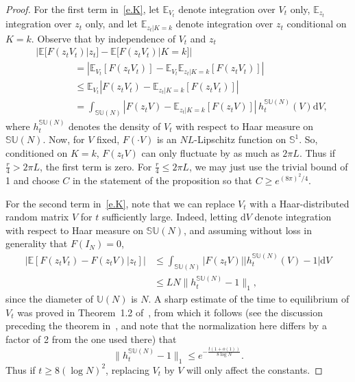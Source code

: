 \documentclass[11pt]{article}
\theoremstyle{definition}
\numberwithin{equation}{section}
\numberwithin{figure}{section}
\numberwithin{table}{section}
\newcommand{\Unitary}[1]{\mathbb{U}\left(#1\right)}
\newcommand{\SUnitary}[1]{\mathbb{SU}\left(#1\right)}
\newcommand{\Circle}{\mathbb{S}^1}
\newcommand{\E}{\mathbb{E}}
\newcommand*{\dd}{\mathrm{d}}
\newcommand*{\dV}{\dd V}
\begin{document}
\begin{proof}
For the first term in~\eqref{e.K}, let $\E_{V_t}$ denote integration over $V_t$ only, $\E_{z_t}$ integration over $z_t$ only, and let $\E_{z_t|K=k}$ denote integration over $z_t$ conditional on $K=k$. Observe that by independence of $V_t$ and $z_t$
\begin{align*}
&\left|\E\big[F(z_tV_t)\big|z_t\big] -\E \big[F(z_tV_t)\big|K=k\big]\right|\\&\qquad\qquad=\left|\E_{V_t}\left[F(z_tV_t)\right]-\E_{V_t}\E_{z_t|K=k}\left[F(z_tV_t)\right]\right|\\&\qquad\qquad\le\E_{V_t}\left|F(z_tV_t)-\E_{z_t|K=k}\left[F(z_tV_t)\right]\right| \\
&\qquad\qquad= \int_{\SUnitary{N}} |F(z_tV) - \mathbb{E}_{z_t|K=k}[F(z_t V)]| \,h^{\SUnitary{N}}_t(V)\dV,
\end{align*}
where $h^{\SUnitary{N}}_t$ denotes the density of $V_t$ with respect to Haar measure on $\SUnitary{N}$. Now, for $V$ fixed, $F(\cdot V)$ is an $NL$-Lipschitz function on $\Circle$. So, conditioned on $K=k$, $F(z_tV)$ can only fluctuate by as much as $2\pi L$. Thus if $\frac{r}{4}>2\pi L$, the first term is zero. For $\frac{r}{4}\le2\pi L$, we may just use the trivial bound of 1 and choose $C$ in the statement of the proposition so that $C\ge e^{(8\pi)^2/4}$.

For the second term in~\eqref{e.K}, note that we can replace $V_t$ with a Haar-distributed random matrix $V$ for $t$ sufficiently large. Indeed, letting $\dV$ denote integration with respect to Haar measure on $\SUnitary{N}$, and assuming without loss in generality that $F(I_N)=0$,
\begin{equation}\label{eC}
\begin{split}
\left|\E\left[F(z_tV_t)-F(z_tV)\big|z_t\right]\right|&\le\int_{\SUnitary{N}}\big|F(z_tV)\big|\big|h^{\SUnitary{N}}_t(V)-1\big|\dV\\&\le LN\|h^{\SUnitary{N}}_t-1\|_1,
\end{split}
\end{equation}
since the diameter of $\Unitary{N}$ is $N$. A sharp estimate of the time to equilibrium of $V_t$ was proved in Theorem~1.2 of~\cite{SC1994b}, from which it follows (see the discussion preceding the theorem in~\cite{SC1994b}, and note that the normalization here differs by a factor of 2 from the one used there) that
\begin{equation}\label{eD}
\|h^{\SUnitary{N}}_t-1\|_1\le e^{-\frac{t(1+o(1))}{8\log N}}.
\end{equation}
Thus if $t\ge8(\log N)^2$, replacing $V_t$ by $V$ will only affect the constants.


\end{proof}
\end{document}
